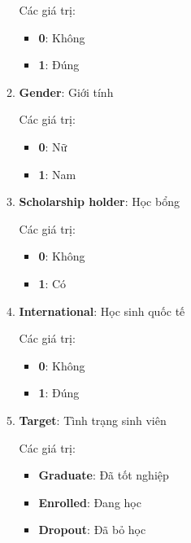 \begin{itemize}
\begin{enumerate}
            Các giá trị:
            \begin{itemize}
                \item \textbf{0}: Không
                \item \textbf{1}: Đúng
            \end{itemize}
    
            \item \textbf{Gender}: Giới tính
            
            Các giá trị:
            \begin{itemize}
                \item \textbf{0}: Nữ
                \item \textbf{1}: Nam
            \end{itemize}

            \item \textbf{Scholarship holder}: Học bổng
            
            Các giá trị:
            \begin{itemize}
                \item \textbf{0}: Không
                \item \textbf{1}: Có
            \end{itemize}

            \item \textbf{International}: Học sinh quốc tế
            
            Các giá trị:
            \begin{itemize}
                \item \textbf{0}: Không
                \item \textbf{1}: Đúng
            \end{itemize}

            \item \textbf{Target}: Tình trạng sinh viên
            
            Các giá trị:
            \begin{itemize}
                \item \textbf{Graduate}: Đã tốt nghiệp
                \item \textbf{Enrolled}: Đang học
                \item \textbf{Dropout}: Đã bỏ học
            \end{itemize}
            
        \end{enumerate}


\end{itemize}
